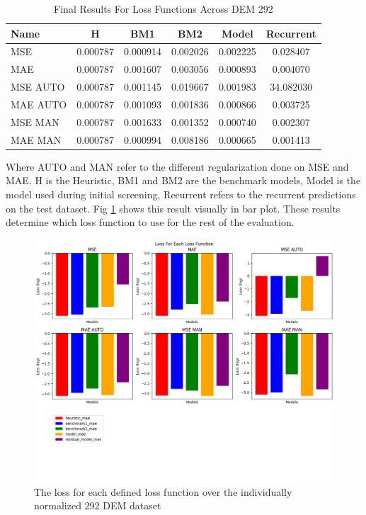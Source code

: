\begin{table}[h]
	\centering
	\caption{Final Results For Loss Functions Across DEM 292}
	\label{tab:loss-functions-dem}
	\begin{tabular}{p{3cm}ccccc}
		\toprule
		Name &  H &  BM1 &  BM2 &  Model &  Recurrent \\
		\midrule
		MSE &       0.000787 &        0.000914 &        0.002026 &   0.002225 &            0.028407 \\
		MAE &       0.000787 &        0.001607 &        0.003056 &   0.000893 &            0.004070 \\
		MSE AUTO &       0.000787 &        0.001145 &        0.019667 &   0.001983 &           34.082030 \\
		MAE AUTO &       0.000787 &        0.001093 &        0.001836 &   0.000866 &            0.003725 \\
		MSE MAN &       0.000787 &        0.001633 &        0.001352 &   0.000740 &            0.002307 \\
		MAE MAN &       0.000787 &        0.000994 &        0.008186 &   0.000665 &            0.001413 \\
		\bottomrule
	\end{tabular}
\end{table}
Where AUTO and MAN refer to the different regularization done on MSE and MAE. H is the Heuristic, BM1 and BM2 are the benchmark models, Model is the model used during initial screening, Recurrent refers to the recurrent predictions on the test dataset. Fig \ref{fig:loss-comparison-initial} shows this result visually in bar plot. These results determine which loss function to use for the rest of the evaluation.

\begin{figure}[tbph]
	\centering
	\includegraphics[width=0.9\linewidth, height=0.5\textheight]{"Figures/Results/Initial screening/LOSS PLOTS/Loss comparison"}
	\caption[Loss function performance on the individually normed 292 DEM dataset]{The loss for each defined loss function over the individually normalized 292 DEM dataset}
	\label{fig:loss-comparison-initial}
\end{figure}


